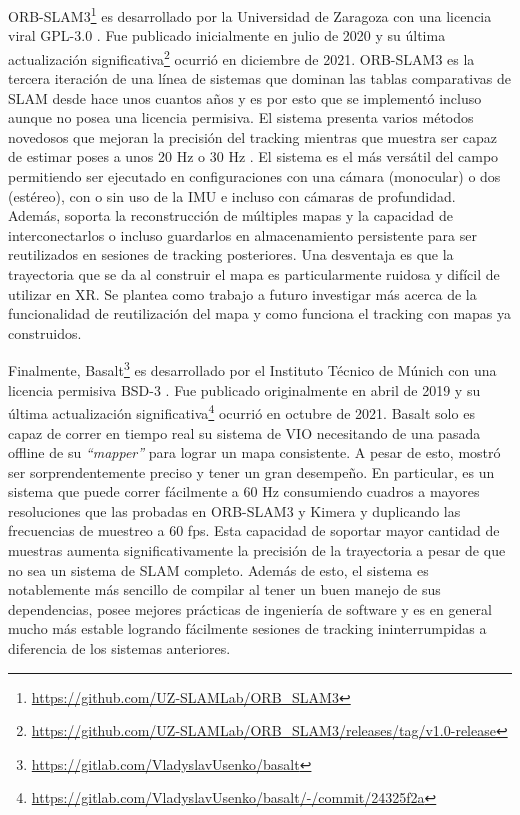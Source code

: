 \documentclass[ twoside,openright,titlepage,numbers=noenddot,%
                headinclude,footinclude,cleardoublepage=empty,abstract=on,
                BCOR=-5mm,paper=a4,fontsize=11pt
                ]{scrreprt}
\begin{document}
ORB-SLAM3\footnote{\url{https://github.com/UZ-SLAMLab/ORB_SLAM3}} es
desarrollado por la Universidad de Zaragoza con una licencia viral
GPL-3.0 \autocite{GNUGeneralPublic}. Fue publicado inicialmente en julio
de 2020 y su última actualización significativa\footnote{\url{https://github.com/UZ-SLAMLab/ORB_SLAM3/releases/tag/v1.0-release}}
ocurrió en diciembre de 2021. ORB-SLAM3 es la tercera iteración de una
línea de sistemas que dominan las tablas comparativas de SLAM desde hace
unos cuantos años y es por esto que se implementó incluso aunque no
posea una licencia permisiva. El sistema presenta varios métodos
novedosos que mejoran la precisión del tracking mientras que muestra ser
capaz de estimar poses a unos 20 Hz o 30 Hz \autocite[Tabla
6]{camposORBSLAM3AccurateOpenSource2021}. El sistema es el más versátil
del campo permitiendo ser ejecutado en configuraciones con una cámara
(monocular) o dos (estéreo), con o sin uso de la IMU e incluso con
cámaras de profundidad. Además, soporta la reconstrucción de múltiples
mapas y la capacidad de interconectarlos o incluso guardarlos en
almacenamiento persistente para ser reutilizados en sesiones de tracking
posteriores. Una desventaja es que la trayectoria que se da al construir
el mapa es particularmente ruidosa y difícil de utilizar en XR. Se
plantea como trabajo a futuro investigar más acerca de la funcionalidad
de reutilización del mapa y como funciona el tracking con mapas ya
construidos.

Finalmente, Basalt\footnote{\url{https://gitlab.com/VladyslavUsenko/basalt}}
es desarrollado por el Instituto Técnico de Múnich con una licencia
permisiva BSD-3 \autocite{3ClauseBSDLicense}. Fue publicado
originalmente en abril de 2019 y su última actualización
significativa\footnote{\url{https://gitlab.com/VladyslavUsenko/basalt/-/commit/24325f2a}}
\autocite{demmelBasaltSquareRoot2021} ocurrió en octubre de 2021. Basalt
solo es capaz de correr en tiempo real su sistema de VIO necesitando de
una pasada offline de su \emph{``mapper''} para lograr un mapa
consistente. A pesar de esto, mostró ser sorprendentemente preciso y
tener un gran desempeño. En particular, es un sistema que puede correr
fácilmente a 60 Hz consumiendo cuadros a mayores resoluciones que las
probadas en ORB-SLAM3 y Kimera y duplicando las frecuencias de muestreo
a 60 fps. Esta capacidad de soportar mayor cantidad de muestras aumenta
significativamente la precisión de la trayectoria a pesar de que no sea
un sistema de SLAM completo. Además de esto, el sistema es notablemente
más sencillo de compilar al tener un buen manejo de sus dependencias,
posee mejores prácticas de ingeniería de software y es en general mucho
más estable logrando fácilmente sesiones de tracking ininterrumpidas a
diferencia de los sistemas anteriores.
\end{document}
